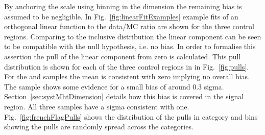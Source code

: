 By anchoring the scale using binning in the \scalht dimension the remaining
bias is assumed to be negligible. In Fig.~\ref{fig:linearFitExamples} 
example fits of an orthogonal linear function to the data/MC ratio 
are shown for the three control regions. Comparing to the inclusive distribution 
the linear component can be seen to be compatible with the null hypothesis, 
i.e. no bias. In order to formalise this assertion 
the pull of the linear component from zero is calculated.
This pull distribution is shown for each of the three control regions in
in Fig.~\ref{fig:pulls}. For the \mmj and \gj samples the mean is consistent 
with zero implying no overall bias. The \mj sample shows some evidence for a small
bias of around 0.3 sigma. Section~\ref{sec:systMhtDimension} details how this bias
is covered in the signal region. All three samples have a sigma consistent with one.
Fig.~\ref{fig:frenchFlagPulls} shows the distribution of the pulls 
in category and \scalht bins showing the pulls are randomly spread across
the categories.




